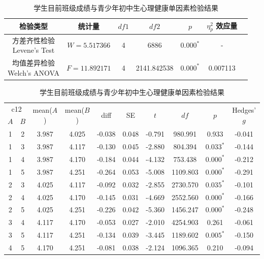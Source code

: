 \documentclass[zihao = -4, linespread = 1.5]{article}
\begin{document}
\begin{table}[htbp]
    \centering
    \setlength{\tabcolsep}{8pt}
    \renewcommand{\arraystretch}{1.2}
    \caption{学生目前班级成绩与青少年初中生心理健康单因素检验结果}\label{table-anova-score-health}
    \begin{tabular}{ccccccc}
        \bottomrule[1.5pt]
        检验类型 & 统计量 & $df1$ & $df2$ & $p$ & $\eta^2_p$ 效应量 \\
        \midrule[0.75pt]
        \makecell{方差齐性检验 \\ Levene's Test} & $W=5.517366$ & 4 & 6886 & $\bm{0.000^{*}}$ & - \\
        \midrule[0.75pt]
        \makecell{均值差异检验 \\ Welch's ANOVA} & $F=11.892171$ & 4 & 2141.842538 & $\bm{0.000^{*}}$ & 0.007113 \\
    \end{tabular}
    \setlength{\tabcolsep}{6pt}
    \renewcommand{\arraystretch}{1.2}
    \begin{tabular}{cccccccccc}
        \bottomrule[1.5pt]
        \multicolumn{2}{c}{c12} & \multirow{2}{*}{mean($A$)} & \multirow{2}{*}{mean($B$)} & \multirow{2}{*}{diff} & \multirow{2}{*}{SE} & \multirow{2}{*}{$t$} & \multirow{2}{*}{$df$} & \multirow{2}{*}{$p$} & \multirow{2}{*}{Hedges' $g$} \\
        \cmidrule[0.75pt](lr){1-2}
        $A$ & $B$ \\
        \midrule[0.75pt]
        1 & 2 & 3.987 & 4.025 & -0.038 & 0.048 & -0.791 & 980.991 & 0.933 & -0.041 \\
        1 & 3 & 3.987 & 4.117 & -0.130 & 0.045 & -2.880 & 804.394 & $\bm{0.033^{*}}$ & -0.144 \\
        1 & 4 & 3.987 & 4.170 & -0.184 & 0.044 & -4.132 & 753.438 & $\bm{0.000^{*}}$ & -0.212 \\
        1 & 5 & 3.987 & 4.251 & -0.264 & 0.053 & -5.008 & 1109.803 & $\bm{0.000^{*}}$ & -0.291 \\
        2 & 3 & 4.025 & 4.117 & -0.092 & 0.032 & -2.855 & 2730.570 & $\bm{0.035^{*}}$ & -0.101 \\
        2 & 4 & 4.025 & 4.170 & -0.145 & 0.031 & -4.669 & 2552.560 & $\bm{0.000^{*}}$ & -0.166 \\
        2 & 5 & 4.025 & 4.251 & -0.226 & 0.042 & -5.360 & 1456.247 & $\bm{0.000^{*}}$ & -0.248 \\
        3 & 4 & 4.117 & 4.170 & -0.053 & 0.027 & -2.010 & 4254.903 & 0.261 & -0.061 \\
        3 & 5 & 4.117 & 4.251 & -0.134 & 0.039 & -3.445 & 1189.602 & $\bm{0.005^{*}}$ & -0.150 \\
        4 & 5 & 4.170 & 4.251 & -0.081 & 0.038 & -2.124 & 1096.365 & 0.210 & -0.094 \\
        \toprule[1.5pt]
    \end{tabular}
\end{table}
\end{document}
